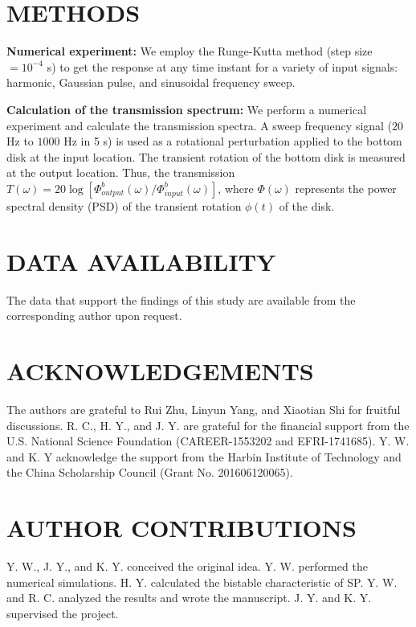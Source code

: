 \documentclass[aps,preprint,onecolumn,showpacs,superscriptaddress,groupedaddress]{revtex4}  %
\begin{document}
\section*{METHODS}

\textbf{Numerical experiment:} We employ the Runge-Kutta method (step size $=10^{-4}$ s) to get the response at any time instant for a variety of input signals: harmonic, Gaussian pulse, and sinusoidal frequency sweep.

\textbf{Calculation of the transmission spectrum:} We perform a numerical experiment and calculate the transmission spectra. A sweep frequency signal ($20$ Hz to $1000$ Hz in 5 s) is used as a rotational perturbation applied to the bottom disk at the input location. The transient rotation of the bottom disk is measured at the output location. Thus, the transmission $T(\omega)=20 \log[\Phi_{output}^{b}(\omega)/\Phi_{input}^{b}(\omega)]$, where $\Phi(\omega)$ represents the power spectral density (PSD) of the transient rotation $\phi(t)$ of the disk.
 
\section*{DATA AVAILABILITY}
The data that support the findings of this study are available from the corresponding author upon request.

\section*{ACKNOWLEDGEMENTS}
The authors are grateful to Rui Zhu, Linyun Yang, and Xiaotian Shi for fruitful discussions. R. C., H. Y., and J. Y. are grateful for the financial support from the U.S. National Science Foundation (CAREER-1553202 and EFRI-1741685). Y. W. and K. Y acknowledge the support from the Harbin Institute of Technology and the China Scholarship Council (Grant No. 201606120065). 

\section*{AUTHOR CONTRIBUTIONS}
Y. W., J. Y., and K. Y. conceived the original idea. Y. W. performed the numerical simulations. H. Y. calculated the bistable characteristic of SP. Y. W. and R. C. analyzed the results and wrote the manuscript. J. Y. and K. Y. supervised the project.
\end{document}
